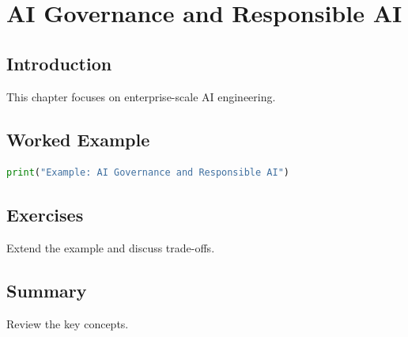 \chapter{AI Governance and Responsible AI}
\label{chap:vol10-11}



\section{Introduction}
This chapter focuses on enterprise-scale AI engineering.

\section{Worked Example}
\begin{lstlisting}[language=Python]
print("Example: AI Governance and Responsible AI")
\end{lstlisting}

\section{Exercises}
\begin{exercise}
Extend the example and discuss trade-offs.
\end{exercise}

\section{Summary}
Review the key concepts.
